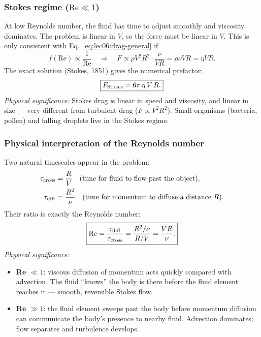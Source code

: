 \subsubsection*{Stokes regime ($\mathrm{Re} \ll 1$)}
At low Reynolds number, the fluid has time to adjust smoothly and viscosity
dominates. The problem is linear in $V$, so the force must be linear in $V$.
This is only consistent with Eq.~\eqref{eq:lec06:drag-general} if
\begin{equation}
    f(\mathrm{Re}) \propto \frac{1}{\mathrm{Re}}
    \quad\Rightarrow\quad
    F \propto \rho V^2 R^2 \cdot \frac{\nu}{VR}
    = \rho\nu VR = \eta VR .
    \label{eq:lec06:stokes-scaling}
\end{equation}
The exact solution (Stokes, 1851) gives the numerical prefactor:
\begin{equation}
    \boxed{
    F_{\rm Stokes} = 6\pi\,\eta\,V\,R .
    }
    \label{eq:lec06:stokes-drag}
\end{equation}
\textit{Physical significance:} Stokes drag is linear in speed and viscosity,
and linear in size — very different from turbulent drag ($F\propto V^2 R^2$).
Small organisms (bacteria, pollen) and falling droplets live in the Stokes
regime.

\subsubsection*{Physical interpretation of the Reynolds number}
Two natural timescales appear in the problem:
\begin{align}
    \tau_{\rm cross}
    &= \frac{R}{V}
    \quad\text{(time for fluid to flow past the object)},
    \label{eq:lec06:tau-cross}\\
    \tau_{\rm diff}
    &= \frac{R^2}{\nu}
    \quad\text{(time for momentum to diffuse a distance } R\text{)}.
    \label{eq:lec06:tau-diff}
\end{align}
Their ratio is exactly the Reynolds number:
\begin{equation}
    \boxed{
    \mathrm{Re}
    = \frac{\tau_{\rm diff}}{\tau_{\rm cross}}
    = \frac{R^2/\nu}{R/V}
    = \frac{VR}{\nu} .
    }
    \label{eq:lec06:re-timescale}
\end{equation}
\textit{Physical significance:}
\begin{itemize}
    \item \textbf{Re $\ll 1$}: viscous diffusion of momentum acts quickly
    compared with advection. The fluid ``knows'' the body is there before
    the fluid element reaches it — smooth, reversible Stokes flow.
    \item \textbf{Re $\gg 1$}: the fluid element sweeps past the body before
    momentum diffusion can communicate the body's presence to nearby
    fluid. Advection dominates; flow separates and turbulence develops.
\end{itemize}


